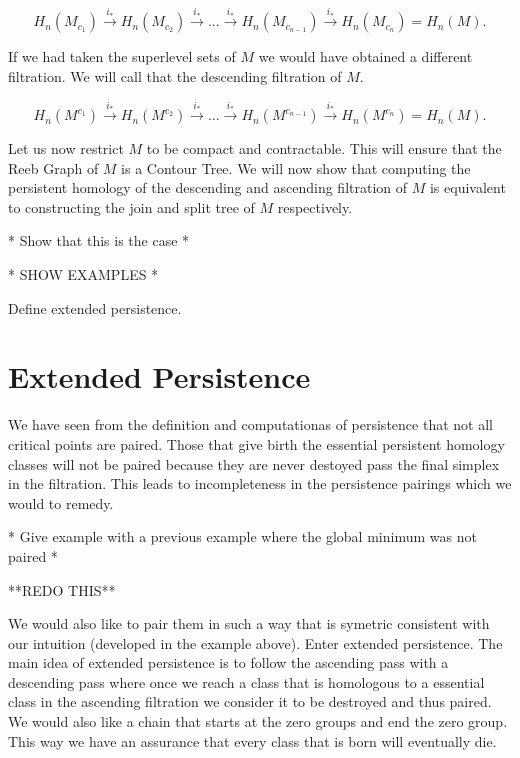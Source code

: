 $$ H_n(M_{c_1}) \overset{i_*}{\longrightarrow} H_n(M_{c_2}) \overset{i_*}{\longrightarrow} ... \overset{i_*}{\longrightarrow} H_n(M_{c_{n-1}}) \overset{i_*}{\longrightarrow} H_n(M_{c_n}) = H_n(M).$$

If we had taken the superlevel sets of $M$ we would have obtained a different filtration. We will call that the descending filtration of $M$.

$$ H_n(M^{c_1}) \overset{i_*}{\longrightarrow} H_n(M^{c_2}) \overset{i_*}{\longrightarrow} ... \overset{i_*}{\longrightarrow} H_n(M^{c_{n-1}}) \overset{i_*}{\longrightarrow} H_n(M^{c_n}) = H_n(M).$$


Let us now restrict $M$ to be compact and contractable. This will ensure that the Reeb Graph of $M$ is a Contour Tree. We will now show that computing the persistent homology of the descending and ascending filtration of $M$ is equivalent to constructing the join and split tree of $M$ respectively.

* Show that this is the case *

* SHOW EXAMPLES *

Define extended persistence.

\section{Extended Persistence}

We have seen from the definition and computationas of persistence that not all critical points are paired. Those that give birth the essential persistent homology classes will not be paired because they are never destoyed pass the final simplex in the filtration. This leads to incompleteness in the persistence pairings which we would to remedy. 

* Give example with a previous example where the global minimum was not paired *

**REDO THIS**

We would also like to pair them in such a way that is symetric consistent with our intuition (developed in the example above). Enter extended persistence. The main idea of extended persistence is to follow the ascending pass with a descending pass where once we reach a class that is homologous to a essential class in the ascending filtration we consider it to be destroyed and thus paired. We would also like a chain that starts at the zero groups and end the zero group. This way we have an assurance that every class that is born will eventually die.

